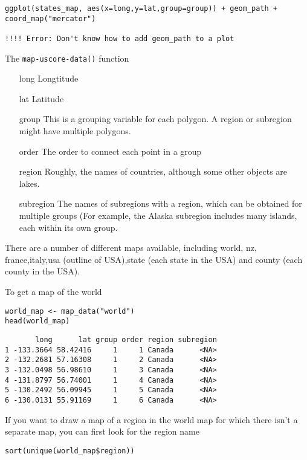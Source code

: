 {\begin{verbatim}
ggplot(states_map, aes(x=long,y=lat,group=group)) + geom_path + coord_map("mercator")

!!!! Error: Don't know how to add geom_path to a plot
\end{verbatim}

The \texttt{map-uscore-data()} function

\begin{itemize}
\item[long] Longtitude
\item[lat] Latitude
\item[group] This is a grouping variable for each polygon. A region or subregion might have multiple polygons.
\item[order] The order to connect each point in a group
\item[region] Roughly, the names of countries, although some other objects are lakes.
\item[subregion] The names of subregions with a region, which can be obtained for multiple groups
(For example, the Alaska subregion includes many islands, each within its own group.
\end{itemize}
There are a number of different maps available, including world, nz, france,italy,usa (outline of USA),state (each state in the USA) and county (each county in the USA).


To get a map of the world
\begin{framed}
\begin{verbatim}
world_map <- map_data("world")
head(world_map)
\end{verbatim}
\end{framed}
\begin{verbatim}
       long      lat group order region subregion
1 -133.3664 58.42416     1     1 Canada      <NA>
2 -132.2681 57.16308     1     2 Canada      <NA>
3 -132.0498 56.98610     1     3 Canada      <NA>
4 -131.8797 56.74001     1     4 Canada      <NA>
5 -130.2492 56.09945     1     5 Canada      <NA>
6 -130.0131 55.91169     1     6 Canada      <NA>
\end{verbatim}


If you want to draw a map of a region in the world map for which there isn't a separate map, you can
first look for the region name

\begin{framed}
\begin{verbatim}
sort(unique(world_map$region))


\end{verbatim}
\end{framed}}
